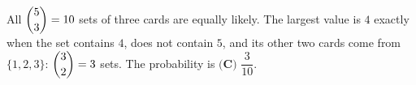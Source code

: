 All $\dbinom53=10$ sets of three cards are equally likely. The largest value is $4$ exactly when the set contains $4$, does not contain $5$, and its other two cards come from $\{1,2,3\}$: $\dbinom32=3$ sets. The probability is $\boxed{\textbf{(C) }\dfrac{3}{10}}$.
